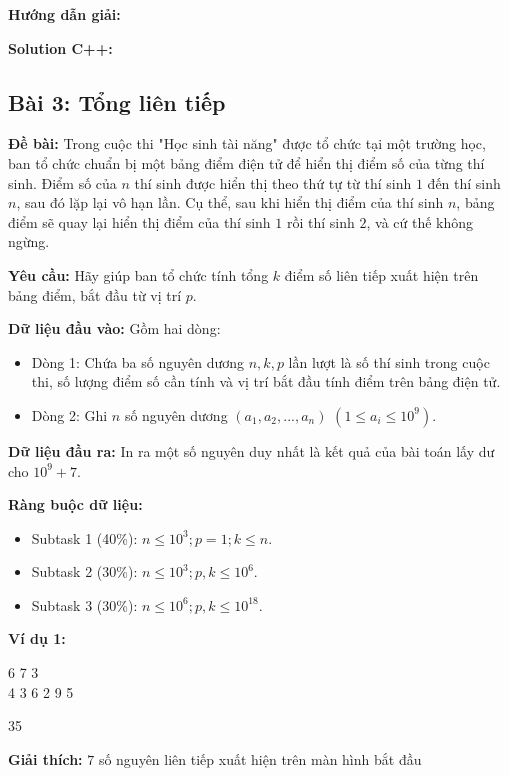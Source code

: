 \documentclass[12pt]{scrartcl}  %
\begin{document}
\textbf{Hướng dẫn giải:}

\textbf{Solution C++:}

\subsection{Bài 3: Tổng liên tiếp}
\textbf{Đề bài:}
Trong cuộc thi "Học sinh tài năng" được tổ chức tại một trường học, ban tổ chức chuẩn bị một
bảng điểm điện tử để hiển thị điểm số của từng thí sinh. Điểm số của $n$ thí sinh được hiển thị theo thứ
tự từ thí sinh $1$ đến thí sinh $n$, sau đó lặp lại vô hạn lần. Cụ thể, sau khi hiển thị điểm của thí sinh $n$,
bảng điểm sẽ quay lại hiển thị điểm của thí sinh $1$ rồi thí sinh $2$, và cứ thế không ngừng.

\textbf{Yêu cầu:}
Hãy giúp ban tổ chức tính tổng $k$ điểm số liên tiếp xuất hiện trên bảng điểm, bắt đầu từ vị trí $p$.

\textbf{Dữ liệu đầu vào:}
Gồm hai dòng:
\begin{itemize}
    \item Dòng 1: Chứa ba số nguyên dương $n, k, p$ lần lượt là số thí sinh trong cuộc thi, số lượng
điểm số cần tính và vị trí bắt đầu tính điểm trên bảng điện tử.
    \item Dòng 2: Ghi $n$ số nguyên dương $(a_1, a_2, ... , a_n)$ $(1 \leq a_i \leq 10^9)$.
\end{itemize}

\textbf{Dữ liệu đầu ra:}
In ra một số nguyên duy nhất là kết quả của bài toán lấy dư cho $10^9 + 7$.

\textbf{Ràng buộc dữ liệu:}
\begin{itemize}
    \item Subtask 1 (40\%): $n \leq 10^3; p = 1; k \leq n$.
    \item Subtask 2 (30\%): $n \leq 10^3; p, k \leq 10^6$.
    \item Subtask 3 (30\%): $n \leq 10^6; p, k \leq 10^{18}$.
\end{itemize}

\textbf{Ví dụ 1:}
\begin{tcolorbox}[colback=gray!5!white, colframe=blue!50!black, title=Input]
6 7 3\\
4 3 6 2 9 5
\end{tcolorbox}
\begin{tcolorbox}[colback=gray!5!white, colframe=green!50!black, title=Output]
35
\end{tcolorbox}

\textbf{Giải thích:}
$7$ số nguyên liên tiếp xuất hiện trên màn hình bắt đầu
\end{document}
